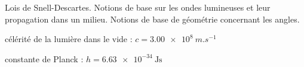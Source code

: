 	
	
	
	\begin{prerequis}
		Lois de Snell-Descartes. Notions de base sur les ondes lumineuses et leur propagation dans un milieu.
		Notions de base de géométrie concernant les angles.
		
\constantesUtiles
	\begin{listeConstantes}
		\item célérité de la lumière dans le vide : $c=\SI{3.00e8}{m.s^{-1}}$
		\item constante de Planck : $h=\SI{6,63e-34}{\joule\second}$
	\end{listeConstantes}
		
	\end{prerequis}
	
	
	
	
	
	

	
	
	
	
	\hauteurLargeurCadreReponse		{8mm}{2cm}
	\typeEntrainement				{} %
	\initialisationEntrainement
	
